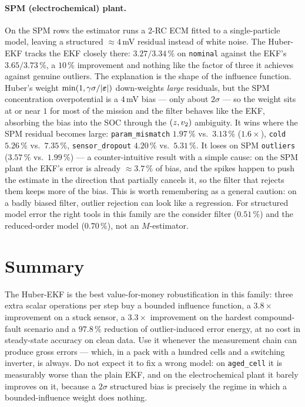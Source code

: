 \paragraph{SPM (electrochemical) plant.}  On the SPM rows the estimator runs a 2-RC ECM fitted to a
single-particle model, leaving a structured $\approx4$\,mV residual instead of white noise.  The
Huber-EKF tracks the EKF closely there: $3.27/3.34\,\%$ on \texttt{nominal} against the EKF's
$3.65/3.73\,\%$, a $10\,\%$ improvement and nothing like the factor of three it achieves against
genuine outliers.  The explanation is the shape of the influence function.  Huber's weight
$\min(1,\gamma\sigma/|\bm{\varepsilon}|)$ down-weights \emph{large} residuals, but the SPM concentration
overpotential is a $4$\,mV bias --- only about $2\sigma$ --- so the weight sits at or near $1$ for
most of the mission and the filter behaves like the EKF, absorbing the bias into the SOC through
the $(z,v_2)$ ambiguity.  It wins where the SPM residual becomes large: \texttt{param\_mismatch}
$1.97\,\%$ vs.\ $3.13\,\%$ ($1.6\times$), \texttt{cold} $5.26\,\%$ vs.\ $7.35\,\%$,
\texttt{sensor\_dropout} $4.20\,\%$ vs.\ $5.31\,\%$.  It loses on SPM \texttt{outliers}
($3.57\,\%$ vs.\ $1.99\,\%$) --- a counter-intuitive result with a simple cause: on the SPM plant
the EKF's error is already $\approx3.7\,\%$ of bias, and the spikes happen to push the estimate in
the direction that partially cancels it, so the filter that rejects them keeps more of the bias.
This is worth remembering as a general caution: on a badly biased filter, outlier rejection can
look like a regression.  For structured model error the right tools in this family are the
consider filter ($0.51\,\%$) and the reduced-order model ($0.70\,\%$), not an $M$-estimator.


\section{Summary}
The Huber-EKF is the best value-for-money robustification in this family: three extra scalar
operations per step buy a bounded influence function, a $3.8\times$ improvement on a stuck sensor,
a $3.3\times$ improvement on the hardest compound-fault scenario and a $97.8\,\%$ reduction of
outlier-induced error energy, at no cost in steady-state accuracy on clean data.  Use it whenever
the measurement chain can produce gross errors --- which, in a pack with a hundred cells and a
switching inverter, is always.  Do not expect it to fix a wrong model: on \texttt{aged\_cell} it is
measurably worse than the plain EKF, and on the electrochemical plant it barely improves on it,
because a $2\sigma$ structured bias is precisely the regime in which a bounded-influence weight
does nothing.
